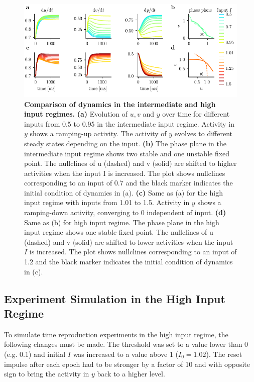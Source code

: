 \documentclass[10pt]{article}
\begin{document}
\begin{figure}[ht]
	\centering
	\includegraphics{figures/supp_regimes.pdf}
	\caption{\textbf{Comparison of dynamics in the intermediate and high input regimes.} 
	\textbf{(a)} Evolution of $u, v$ and $y$ over time for different inputs from 0.5 to 0.95 in the intermediate input regime. Activity in $y$ shows a ramping-up activity. The activity of $y$ evolves to different steady states depending on the input. 
	\textbf{(b)}  The phase plane in the intermediate input regime shows two stable and one unstable fixed point. The nullclines of u (dashed) and v (solid) are shifted to higher activities when the input I is increased. The plot shows nullclines corresponding to an input of 0.7 and the black marker indicates the initial condition of dynamics in (a).
	\textbf{(c)} Same as (a) for the high input regime with inputs from 1.01 to 1.5. Activity in $y$ shows a ramping-down activity, converging to 0 independent of input.
	\textbf{(d)} Same as (b) for high input regime.  The phase plane in the high input
	regime shows one stable fixed point. The nullclines of u (dashed) and v (solid) are
	shifted to lower activities when the input $I$ is increased. The plot shows nullclines corresponding to an input of 1.2 and the black marker indicates the initial condition of dynamics in (c).
	}
\label{regimes}
\end{figure}

\subsection{Experiment Simulation in the High Input Regime}
To simulate time reproduction experiments in the high input regime, the following changes must be made. 
The threshold was set to a value lower than 0 (e.g. 0.1) and initial $I$ was increased to a value above 1 ($I_0 = 1.02$). The reset impulse after each epoch had to be stronger by a factor of 10 and with opposite sign to bring the activity in $y$ back to a higher level.
\end{document}

